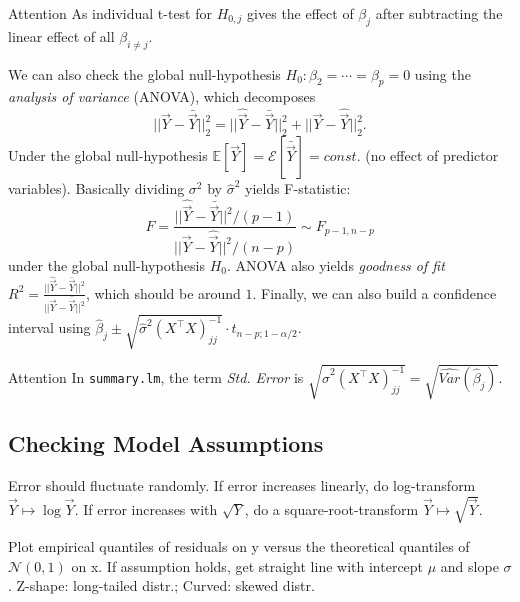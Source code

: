 \begin{attentionbox}{Attention}\nospacing{}
 As individual t-test for $H_{0,j}$ gives the effect of $\beta_{j}$ after subtracting the linear effect of all $\beta_{i\neq j}$.
\end{attentionbox}

 \begin{sectionbox}\nospacing{}
  We can also check the global null-hypothesis $H_{0}: \beta_{2} = \cdots = \beta_{p} = 0$ using the \emph{analysis of variance} (ANOVA), which decomposes
  \[||\vec{Y} - \bar{\vec{Y}}||^{2}_{2} = ||\hat{\vec{Y}} - \bar{\vec{Y}}||^{2}_{2} + ||\vec{Y} - \hat{\vec{Y}}||^{2}_{2}.\]
  Under the global null-hypothesis $\mathbb{E}[\vec{Y}] = \mathcal{E}[\bar{\vec{Y}}] = const$. (no effect of predictor variables). Basically dividing $\sigma^{2}$ by $\hat \sigma^{2}$ yields F-statistic:
  \[F = \frac{||\hat{\vec{Y}} - \bar{\vec{Y}}||^{2}/(p-1)}{||\vec{Y} - \hat{\vec{Y}}||^{2} / (n-p)} \sim F_{p-1,n-p}\] under the global null-hypothesis $H_{0}$.
  ANOVA also yields \emph{goodness of fit} $R^{2} = \frac{||\hat{\vec{Y}} - \bar{\vec{Y}}||^{2}}{||\vec{Y} - \bar{\vec{Y}}||^{2}}$, which should be around $1$.
  Finally, we can also build a confidence interval using $\hat \beta_{j} \pm \sqrt{\hat \sigma^{2}{{(X^{\top}X)}^{-1}_{jj}}} \cdot t_{n-p;1-\alpha/2}$.
 \end{sectionbox}

\begin{attentionbox}{Attention}\nospacing{}
 In \verb!summary.lm!, the term \emph{Std. Error} is $\sqrt{\hat \sigma^{2}{{(X^{\top}X)}^{-1}_{jj}}} = \sqrt{\hat{Var}(\hat \beta_{j})}$.
\end{attentionbox}

\subsection{Checking Model Assumptions}\label{subsec:checking_model_assumptions}
\begin{sectionbox}\nospacing{}
  Error should fluctuate randomly. If error increases linearly, do log-transform $\vec{Y} \mapsto \log{\vec{Y}}$. If error increases with $\sqrt{Y}$, do a square-root-transform $\vec{Y} \mapsto \sqrt{\vec{Y}}$.
\end{sectionbox}
\begin{sectionbox}\nospacing{}
  Plot empirical quantiles of residuals on y versus the theoretical quantiles of $\mathcal{N}(0,1)$ on x.
  If assumption holds, get straight line with intercept $\mu$ and slope $\sigma$.
  Z-shape: long-tailed distr.; Curved: skewed distr.
\end{sectionbox}


